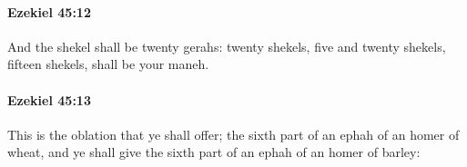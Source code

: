 		\paragraph{Ezekiel 45:12} %
			\label{EZEKIEL-45-12}

			And the shekel shall be twenty gerahs: twenty shekels, five and twenty shekels, fifteen shekels, shall be your maneh.


		\paragraph{Ezekiel 45:13} %
			\label{EZEKIEL-45-13}

			This is the oblation that ye shall offer; the sixth part of an ephah of an homer of wheat, and ye shall give the sixth part of an ephah of an homer of barley:


